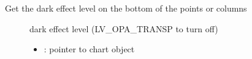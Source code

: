 \documentclass[letterpaper,10pt,english]{sphinxmanual}
\begin{document}

\begin{fulllineitems}
\label{\detokenize{object-types/chart:_CPPv427lv_chart_get_series_darkingPK8lv_obj_t}}%
\pysigstartmultiline
{}\label{\detokenize{object-types/chart:lv__chart_8h_1a947d11e1d5341caad22ba5dc0f036145}}%
\pysigstopmultiline
Get the dark effect level on the bottom of the points or columns \begin{description}
\item[{}] \leavevmode
dark effect level (LV\_OPA\_TRANSP to turn off) 

\item[{}] \leavevmode\begin{itemize}
\item {} 
: pointer to chart object 

\end{itemize}

\end{description}


\end{fulllineitems}

\end{document}
